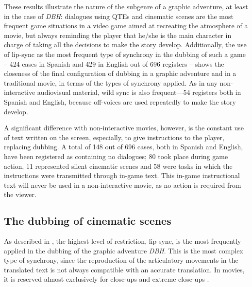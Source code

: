 \documentclass[output=paper]{langsci/langscibook}
\begin{document}
These results illustrate the nature of the subgenre of a graphic adventure, at least in the case of \textit{DBH}: dialogues using QTEs and cinematic scenes are the most frequent game situations in a video game aimed at recreating the atmosphere of a movie, but always reminding the player that he/she is the main character in charge of taking all the decisions to make the story develop. Additionally, the use of lip-sync as the most frequent type of synchrony in the dubbing of such a game -- 424 cases in Spanish and 429 in English out of 696 registers -- shows the closeness of the final configuration of dubbing in a graphic adventure and in a traditional movie, in terms of the types of synchrony applied. As in any non-interactive audiovisual material, wild sync is also frequent—54 registers both in Spanish and English, because off-voices are used repeatedly to make the story develop.

A significant difference with non-interactive movies, however, is the constant use of text written on the screen, especially, to give instructions to the player, replacing dubbing. A total of 148 out of 696 cases, both in Spanish and English, have been registered as containing no dialogues; 80 took place during game action, 11 represented silent cinematic scenes and 58 were tasks in which the instructions were transmitted through in-game text. This in-game instructional text will never be used in a non-interactive movie, as no action is required from the viewer.

\subsection{The dubbing of cinematic scenes}

As described in , the highest level of restriction, lip-sync, is the most frequently applied in the dubbing of the graphic adventure \textit{DBH}. This is the most complex type of synchrony, since the reproduction of the articulatory movements in the translated text is not always compatible with an accurate translation. In movies, it is reserved almost exclusively for close-ups and extreme close-ups \parencite{chaume12}.
\end{document}
